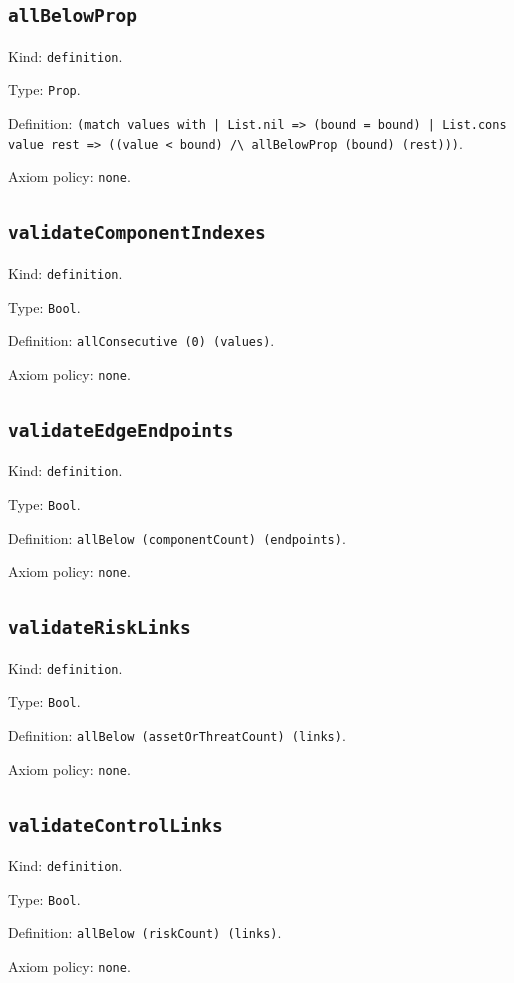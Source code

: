 \documentclass[11pt]{article}
\begin{document}
\subsection*{\texttt{allBelowProp}}
\noindent Kind: \texttt{definition}.\par
\noindent Type: \texttt{Prop}.\par
\noindent Definition: \texttt{(match values with | List.nil => (bound = bound) | List.cons value rest => ((value < bound) /\textbackslash{} allBelowProp (bound) (rest)))}.\par
\noindent Axiom policy: \texttt{none}.\par
\subsection*{\texttt{validateComponentIndexes}}
\noindent Kind: \texttt{definition}.\par
\noindent Type: \texttt{Bool}.\par
\noindent Definition: \texttt{allConsecutive (0) (values)}.\par
\noindent Axiom policy: \texttt{none}.\par
\subsection*{\texttt{validateEdgeEndpoints}}
\noindent Kind: \texttt{definition}.\par
\noindent Type: \texttt{Bool}.\par
\noindent Definition: \texttt{allBelow (componentCount) (endpoints)}.\par
\noindent Axiom policy: \texttt{none}.\par
\subsection*{\texttt{validateRiskLinks}}
\noindent Kind: \texttt{definition}.\par
\noindent Type: \texttt{Bool}.\par
\noindent Definition: \texttt{allBelow (assetOrThreatCount) (links)}.\par
\noindent Axiom policy: \texttt{none}.\par
\subsection*{\texttt{validateControlLinks}}
\noindent Kind: \texttt{definition}.\par
\noindent Type: \texttt{Bool}.\par
\noindent Definition: \texttt{allBelow (riskCount) (links)}.\par
\noindent Axiom policy: \texttt{none}.\par
\end{document}
